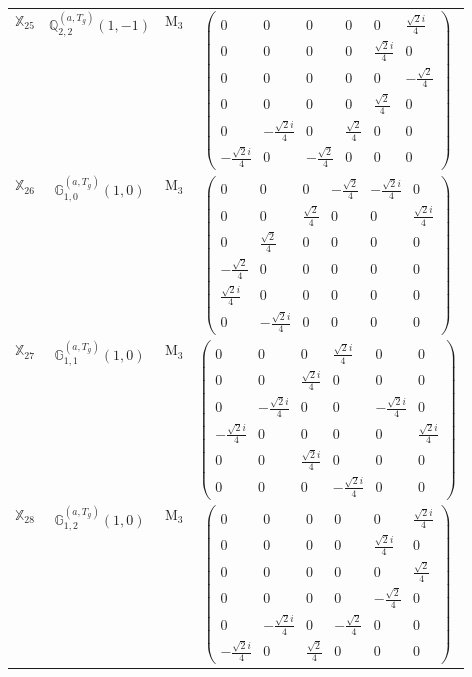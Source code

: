 \documentclass[fleqn,10pt,landscape]{article}
\begin{document}
\begin{itemize}
\begin{center}
\begin{longtable}{c|c|c|c}
$ \mathbb{X}_{25} $ & $\mathbb{Q}_{2,2}^{(a,T_{g})}(1,-1)$ & M$_{3}$ & $\begin{pmatrix} 0 & 0 & 0 & 0 & 0 & \frac{\sqrt{2} i}{4} \\ 0 & 0 & 0 & 0 & \frac{\sqrt{2} i}{4} & 0 \\ 0 & 0 & 0 & 0 & 0 & - \frac{\sqrt{2}}{4} \\ 0 & 0 & 0 & 0 & \frac{\sqrt{2}}{4} & 0 \\ 0 & - \frac{\sqrt{2} i}{4} & 0 & \frac{\sqrt{2}}{4} & 0 & 0 \\ - \frac{\sqrt{2} i}{4} & 0 & - \frac{\sqrt{2}}{4} & 0 & 0 & 0 \end{pmatrix}$ \\
$ \mathbb{X}_{26} $ & $\mathbb{G}_{1,0}^{(a,T_{g})}(1,0)$ & M$_{3}$ & $\begin{pmatrix} 0 & 0 & 0 & - \frac{\sqrt{2}}{4} & - \frac{\sqrt{2} i}{4} & 0 \\ 0 & 0 & \frac{\sqrt{2}}{4} & 0 & 0 & \frac{\sqrt{2} i}{4} \\ 0 & \frac{\sqrt{2}}{4} & 0 & 0 & 0 & 0 \\ - \frac{\sqrt{2}}{4} & 0 & 0 & 0 & 0 & 0 \\ \frac{\sqrt{2} i}{4} & 0 & 0 & 0 & 0 & 0 \\ 0 & - \frac{\sqrt{2} i}{4} & 0 & 0 & 0 & 0 \end{pmatrix}$ \\
$ \mathbb{X}_{27} $ & $\mathbb{G}_{1,1}^{(a,T_{g})}(1,0)$ & M$_{3}$ & $\begin{pmatrix} 0 & 0 & 0 & \frac{\sqrt{2} i}{4} & 0 & 0 \\ 0 & 0 & \frac{\sqrt{2} i}{4} & 0 & 0 & 0 \\ 0 & - \frac{\sqrt{2} i}{4} & 0 & 0 & - \frac{\sqrt{2} i}{4} & 0 \\ - \frac{\sqrt{2} i}{4} & 0 & 0 & 0 & 0 & \frac{\sqrt{2} i}{4} \\ 0 & 0 & \frac{\sqrt{2} i}{4} & 0 & 0 & 0 \\ 0 & 0 & 0 & - \frac{\sqrt{2} i}{4} & 0 & 0 \end{pmatrix}$ \\
$ \mathbb{X}_{28} $ & $\mathbb{G}_{1,2}^{(a,T_{g})}(1,0)$ & M$_{3}$ & $\begin{pmatrix} 0 & 0 & 0 & 0 & 0 & \frac{\sqrt{2} i}{4} \\ 0 & 0 & 0 & 0 & \frac{\sqrt{2} i}{4} & 0 \\ 0 & 0 & 0 & 0 & 0 & \frac{\sqrt{2}}{4} \\ 0 & 0 & 0 & 0 & - \frac{\sqrt{2}}{4} & 0 \\ 0 & - \frac{\sqrt{2} i}{4} & 0 & - \frac{\sqrt{2}}{4} & 0 & 0 \\ - \frac{\sqrt{2} i}{4} & 0 & \frac{\sqrt{2}}{4} & 0 & 0 & 0 \end{pmatrix}$ \\

\end{longtable}
\end{center}
\end{itemize}
\end{document}
